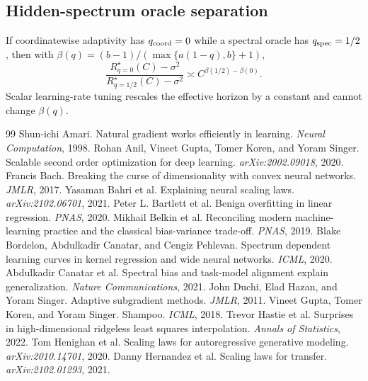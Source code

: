\documentclass{article}
\begin{document}
\subsection{Hidden-spectrum oracle separation}
If coordinatewise adaptivity has $q_{\rm coord}=0$ while a spectral oracle has $q_{\rm spec}=1/2$, then with $\beta(q)=(b-1)/(\max\{a(1-q),b\}+1)$,
\[
    \frac{R^\star_{q=0}(C)-\sigma^2}{R^\star_{q=1/2}(C)-\sigma^2}\asymp C^{\beta(1/2)-\beta(0)}.
\]
Scalar learning-rate tuning rescales the effective horizon by a constant and cannot change $\beta(q)$.

\begin{thebibliography}{99}
 Shun-ichi Amari. Natural gradient works efficiently in learning. \emph{Neural Computation}, 1998.
 Rohan Anil, Vineet Gupta, Tomer Koren, and Yoram Singer. Scalable second order optimization for deep learning. \emph{arXiv:2002.09018}, 2020.
 Francis Bach. Breaking the curse of dimensionality with convex neural networks. \emph{JMLR}, 2017.
 Yasaman Bahri et al. Explaining neural scaling laws. \emph{arXiv:2102.06701}, 2021.
 Peter L. Bartlett et al. Benign overfitting in linear regression. \emph{PNAS}, 2020.
 Mikhail Belkin et al. Reconciling modern machine-learning practice and the classical bias-variance trade-off. \emph{PNAS}, 2019.
 Blake Bordelon, Abdulkadir Canatar, and Cengiz Pehlevan. Spectrum dependent learning curves in kernel regression and wide neural networks. \emph{ICML}, 2020.
 Abdulkadir Canatar et al. Spectral bias and task-model alignment explain generalization. \emph{Nature Communications}, 2021.
 John Duchi, Elad Hazan, and Yoram Singer. Adaptive subgradient methods. \emph{JMLR}, 2011.
 Vineet Gupta, Tomer Koren, and Yoram Singer. Shampoo. \emph{ICML}, 2018.
 Trevor Hastie et al. Surprises in high-dimensional ridgeless least squares interpolation. \emph{Annals of Statistics}, 2022.
 Tom Henighan et al. Scaling laws for autoregressive generative modeling. \emph{arXiv:2010.14701}, 2020.
 Danny Hernandez et al. Scaling laws for transfer. \emph{arXiv:2102.01293}, 2021.

\end{thebibliography}
\end{document}
